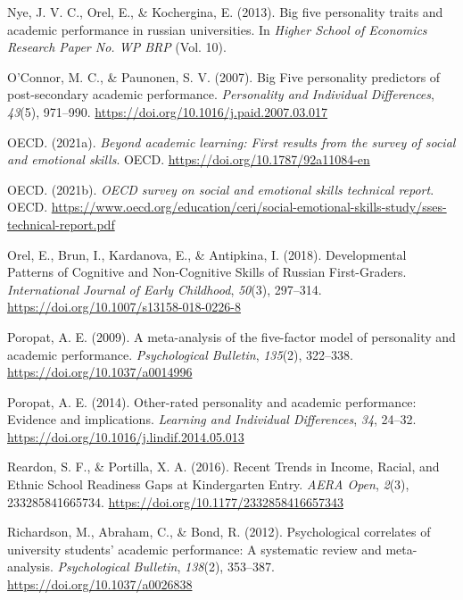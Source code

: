\documentclass[
  12pt,
  a4paper,
]{article}
\newlength{\cslhangindent}
\newlength{\cslentryspacingunit} %
\newenvironment{CSLReferences}[2] %
 {%
  \setlength{\parindent}{0pt}
  \ifodd #1
  \let\oldpar\par
  \def\par{\hangindent=\cslhangindent\oldpar}
  \fi
  \setlength{\parskip}{#2\cslentryspacingunit}
 }%
 {}
\begin{document}
\begin{CSLReferences}{1}{0}
\leavevmode{}%
Nye, J. V. C., Orel, E., \& Kochergina, E. (2013). Big five personality
traits and academic performance in russian universities. In \emph{Higher
School of Economics Research Paper No. WP BRP} (Vol. 10).

\leavevmode{}%
O'Connor, M. C., \& Paunonen, S. V. (2007). Big Five personality
predictors of post-secondary academic performance. \emph{Personality and
Individual Differences}, \emph{43}(5), 971--990.
\url{https://doi.org/10.1016/j.paid.2007.03.017}

\leavevmode{}%
OECD. (2021a). \emph{Beyond academic learning: First results from the
survey of social and emotional skills}. OECD.
\url{https://doi.org/10.1787/92a11084-en}

\leavevmode{}%
OECD. (2021b). \emph{OECD survey on social and emotional skills
technical report}. OECD.
\url{https://www.oecd.org/education/ceri/social-emotional-skills-study/sses-technical-report.pdf}

\leavevmode{}%
Orel, E., Brun, I., Kardanova, E., \& Antipkina, I. (2018).
Developmental Patterns of Cognitive and Non-Cognitive Skills of Russian
First-Graders. \emph{International Journal of Early Childhood},
\emph{50}(3), 297--314. \url{https://doi.org/10.1007/s13158-018-0226-8}

\leavevmode{}%
Poropat, A. E. (2009). A meta-analysis of the five-factor model of
personality and academic performance. \emph{Psychological Bulletin},
\emph{135}(2), 322--338. \url{https://doi.org/10.1037/a0014996}

\leavevmode{}%
Poropat, A. E. (2014). Other-rated personality and academic performance:
Evidence and implications. \emph{Learning and Individual Differences},
\emph{34}, 24--32. \url{https://doi.org/10.1016/j.lindif.2014.05.013}

\leavevmode{}%
Reardon, S. F., \& Portilla, X. A. (2016). Recent Trends in Income,
Racial, and Ethnic School Readiness Gaps at Kindergarten Entry.
\emph{AERA Open}, \emph{2}(3), 233285841665734.
\url{https://doi.org/10.1177/2332858416657343}

\leavevmode{}%
Richardson, M., Abraham, C., \& Bond, R. (2012). Psychological
correlates of university students' academic performance: A systematic
review and meta-analysis. \emph{Psychological Bulletin}, \emph{138}(2),
353--387. \url{https://doi.org/10.1037/a0026838}


\end{CSLReferences}
\end{document}
